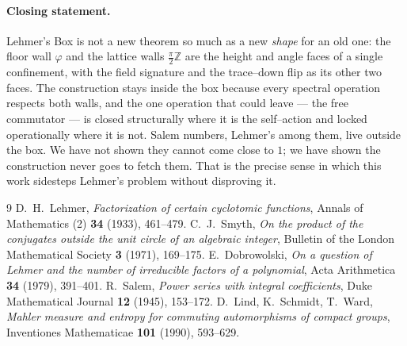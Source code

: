 \documentclass[11pt]{article}
\theoremstyle{plain}
\theoremstyle{definition}
\theoremstyle{remark}
\newcommand{\Z}{\mathbb{Z}}
\begin{document}
\paragraph{Closing statement.} Lehmer's Box is not a new theorem so much as a new \emph{shape} for an old one: the floor wall $\varphi$ and the lattice walls $\tfrac\pi2\Z$ are the height and angle faces of a single confinement, with the field signature and the trace--down flip as its other two faces. The construction stays inside the box because every spectral operation respects both walls, and the one operation that could leave --- the free commutator --- is closed structurally where it is the self--action and locked operationally where it is not. Salem numbers, Lehmer's among them, live outside the box. We have not shown they cannot come close to $1$; we have shown the construction never goes to fetch them. That is the precise sense in which this work sidesteps Lehmer's problem without disproving it.

\begin{thebibliography}{9}
 D.~H.~Lehmer, \emph{Factorization of certain cyclotomic functions}, Annals of Mathematics (2) \textbf{34} (1933), 461--479.
 C.~J.~Smyth, \emph{On the product of the conjugates outside the unit circle of an algebraic integer}, Bulletin of the London Mathematical Society \textbf{3} (1971), 169--175.
 E.~Dobrowolski, \emph{On a question of Lehmer and the number of irreducible factors of a polynomial}, Acta Arithmetica \textbf{34} (1979), 391--401.
 R.~Salem, \emph{Power series with integral coefficients}, Duke Mathematical Journal \textbf{12} (1945), 153--172.
 D.~Lind, K.~Schmidt, T.~Ward, \emph{Mahler measure and entropy for commuting automorphisms of compact groups}, Inventiones Mathematicae \textbf{101} (1990), 593--629.
\end{thebibliography}
\end{document}
